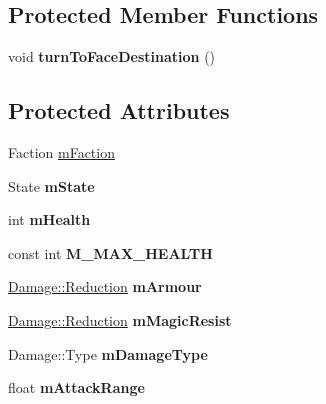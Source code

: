\subsection*{Protected Member Functions}
\begin{DoxyCompactItemize}
\item 
\hypertarget{class_pawn_a2b643e27c2cd87e523e126701854e653}{}void {\bfseries turn\+To\+Face\+Destination} ()\label{class_pawn_a2b643e27c2cd87e523e126701854e653}

\end{DoxyCompactItemize}
\subsection*{Protected Attributes}
\begin{DoxyCompactItemize}
\item 
Faction \hyperlink{class_pawn_ad37825a7c274b2418d2e9d9bdd8afbf1}{m\+Faction}
\item 
\hypertarget{class_pawn_a336b9f5503c10d5b40bd8d58cd47e0bf}{}State {\bfseries m\+State}\label{class_pawn_a336b9f5503c10d5b40bd8d58cd47e0bf}

\item 
\hypertarget{class_pawn_a42103e78d43def077c51e85eba4f97aa}{}int {\bfseries m\+Health}\label{class_pawn_a42103e78d43def077c51e85eba4f97aa}

\item 
\hypertarget{class_pawn_a16586cb1f57ba853ffb43b81e8373048}{}const int {\bfseries M\+\_\+\+M\+A\+X\+\_\+\+H\+E\+A\+L\+T\+H}\label{class_pawn_a16586cb1f57ba853ffb43b81e8373048}

\item 
\hypertarget{class_pawn_aa843639a827f0c9b001a91e567612ebd}{}\hyperlink{struct_damage_1_1_reduction}{Damage\+::\+Reduction} {\bfseries m\+Armour}\label{class_pawn_aa843639a827f0c9b001a91e567612ebd}

\item 
\hypertarget{class_pawn_a6ea62d8582b09f47efff68098756bb99}{}\hyperlink{struct_damage_1_1_reduction}{Damage\+::\+Reduction} {\bfseries m\+Magic\+Resist}\label{class_pawn_a6ea62d8582b09f47efff68098756bb99}

\item 
\hypertarget{class_pawn_a61e5e39820ded53d295335a7691a833d}{}Damage\+::\+Type {\bfseries m\+Damage\+Type}\label{class_pawn_a61e5e39820ded53d295335a7691a833d}

\item 
\hypertarget{class_pawn_afe2ae3e074f4376171afd1245c8f2ccb}{}float {\bfseries m\+Attack\+Range}\label{class_pawn_afe2ae3e074f4376171afd1245c8f2ccb}


\end{DoxyCompactItemize}
